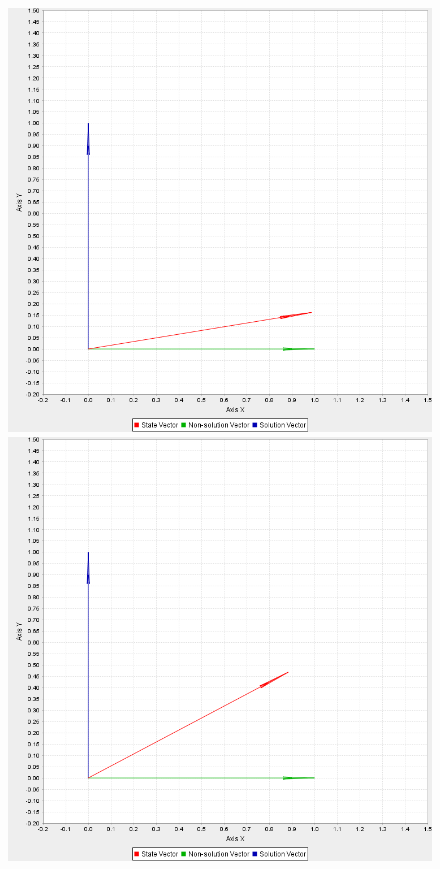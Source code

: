 \documentclass[bibliography=totocnumbered, 10pt]{article}
\theoremstyle{NoticeStyle}
\begin{document}
\begin{figure}[H]
	\begin{minipage}{0.33\textwidth}
		\includegraphics[width=\textwidth]{img/pic_0.png}
	\end{minipage}
	\begin{minipage}{0.33\textwidth}
		\includegraphics[width=\textwidth]{img/pic_3.png}

\end{minipage}
\end{figure}
\end{document}
